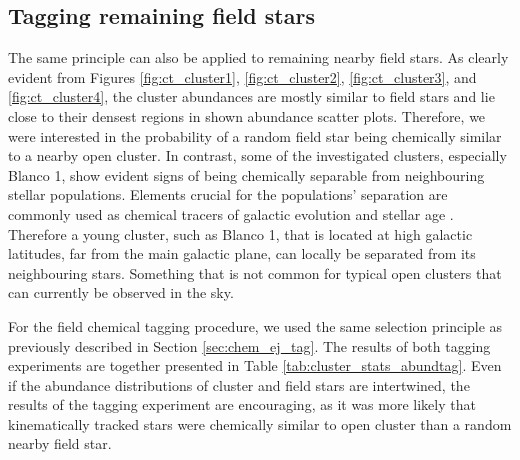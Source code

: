 \subsection{Tagging remaining field stars}
\label{sec:chem_fi_tag}
The same principle can also be applied to remaining nearby field stars. As clearly evident from Figures \ref{fig:ct_cluster1}, \ref{fig:ct_cluster2}, \ref{fig:ct_cluster3}, and \ref{fig:ct_cluster4}, the cluster abundances are mostly similar to field stars and lie close to their densest regions in shown abundance scatter plots. Therefore, we were interested in the probability of a random field star being chemically similar to a nearby open cluster. In contrast, some of the investigated clusters, especially Blanco 1, show evident signs of being chemically separable from neighbouring stellar populations. Elements crucial for the populations' separation are commonly used as chemical tracers of galactic evolution and stellar age \citep{2003A&A...410..527B, 2018MNRAS.474.2580S, 2020MNRAS.491.2043L}. Therefore a young cluster, such as Blanco 1, that is located at high galactic latitudes, far from the main galactic plane, can locally be separated from its neighbouring stars. Something that is not common for typical open clusters that can currently be observed in the sky.

For the field chemical tagging procedure, we used the same selection principle as previously described in Section \ref{sec:chem_ej_tag}. The results of both tagging experiments are together presented in Table \ref{tab:cluster_stats_abundtag}. Even if the abundance distributions of cluster and field stars are intertwined, the results of the tagging experiment are encouraging, as it was more likely that kinematically tracked stars were chemically similar to open cluster than a random nearby field star.


